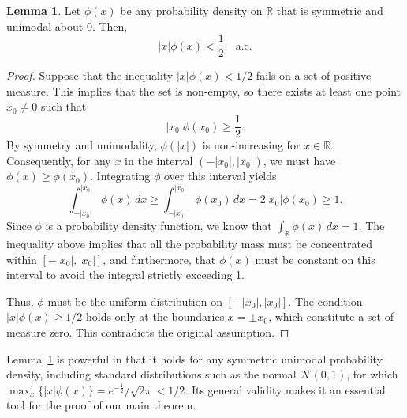 \documentclass[conference]{IEEEtran}
\theoremstyle{definition}
\newtheorem{lemma}[theorem]{Lemma}
\begin{document}
\begin{lemma}\label{leq 0.5}
Let \( \phi(x) \) be any probability density on $\mathbb{R}$ that is symmetric and unimodal about 0.
Then,
\[
    |x|\phi(x) < \frac{1}{2} \quad \text{a.e.}
\]
\end{lemma}

\begin{proof}
Suppose that the inequality \( |x|\phi(x) < 1/2 \) fails on a set of positive measure.
This implies that the set is non-empty, so there exists at least one point \( x_0 \neq 0 \) such that
\[
|x_0|\phi(x_0) \geq \frac{1}{2}.
\]
By symmetry and unimodality, \( \phi(|x|) \) is non-increasing for \( x \in \mathbb{R} \). Consequently, for any \( x \) in the interval \( (-|x_0|, |x_0|) \), we must have \( \phi(x) \geq \phi(x_0) \). Integrating \( \phi \) over this interval yields
\[
\int_{-|x_0|}^{|x_0|} \phi(x)\,dx \geq \int_{-|x_0|}^{|x_0|} \phi(x_0)\,dx = 2|x_0|\phi(x_0) \geq 1.
\]
Since \( \phi \) is a probability density function, we know that \( \int_{\mathbb{R}} \phi(x)\,dx = 1 \). The inequality above implies that all the probability mass must be concentrated within \( [-|x_0|, |x_0|] \), and furthermore, that \( \phi(x) \) must be constant on this interval to avoid the integral strictly exceeding 1.

Thus, \( \phi \) must be the uniform distribution on \( [-|x_0|, |x_0|] \). The condition \( |x|\phi(x) \geq 1/2 \) holds only at the boundaries \( x = \pm x_0 \), which constitute a set of measure zero. This contradicts the original assumption.
\end{proof}

Lemma~\ref{leq 0.5} is powerful in that it holds for any symmetric unimodal probability density, 
including standard distributions such as the normal $\mathcal{N}(0,1)$, 
for which $\max_{x}\{|x|\phi(x)\}= e^{-\frac12}/{\sqrt{2\pi}} < 1/2$. Its general validity makes it an essential tool for the proof of our main theorem.
\end{document}
